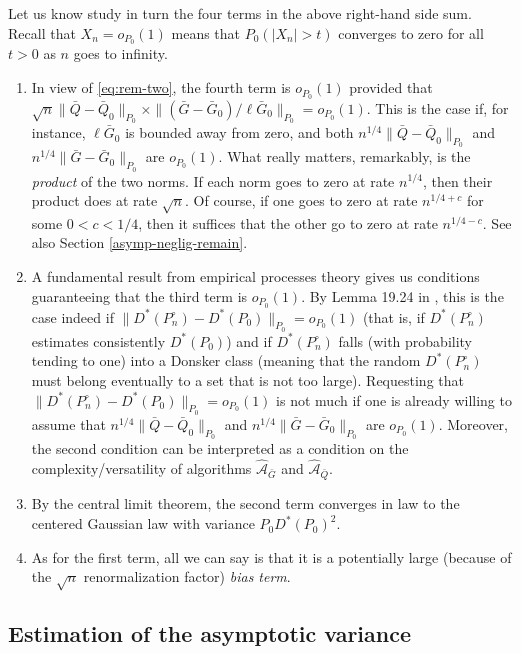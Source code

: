 \documentclass[
  11pt,
  openright,twoside]{book}
\newcommand{\Algo}{\widehat{\mathcal{A}}}
\newcommand{\Gbar}{\bar{G}}
\newcommand{\Phat}{P^{\circ}}
\newcommand{\Qbar}{\bar{Q}}
\theoremstyle{definition}
\theoremstyle{definition}
\theoremstyle{definition}
\theoremstyle{definition}
\theoremstyle{remark}
\begin{document}
Let us know study in turn the four terms in the above right-hand side
sum. Recall that \(X_n = o_{P_0}(1)\) means that \(P_0(|X_n| > t)\) converges to
zero for all \(t>0\) as \(n\) goes to infinity.

\begin{enumerate}
\def\labelenumi{\arabic{enumi}.}
\item
  In view of \eqref{eq:rem-two}, the fourth term is \(o_{P_0}(1)\) provided that
  \(\sqrt{n}\|\Qbar - \Qbar_{0}\|_{P_0} \times \|(\Gbar - \Gbar_{0})/\ell\Gbar_{0}\|_{P_0} = o_{P_0}(1)\). This is the case if, for
  instance, \(\ell\Gbar_{0}\) is bounded away from zero, and both
  \(n^{1/4}\|\Qbar - \Qbar_{0}\|_{P_0}\) and \(n^{1/4}\|\Gbar - \Gbar_{0}\|_{P_0}\) are \(o_{P_0}(1)\). What really matters, remarkably, is
  the \emph{product} of the two norms. If each norm goes to zero at rate
  \(n^{1/4}\), then their product does at rate \(\sqrt{n}\). Of course, if one
  goes to zero at rate \(n^{1/4 + c}\) for some \(0<c<1/4\), then it suffices
  that the other go to zero at rate \(n^{1/4 - c}\). See also Section
  \ref{asymp-neglig-remain}.
\item
  A fundamental result from empirical processes theory gives us conditions
  guaranteeing that the third term is \(o_{P_0}(1)\). By Lemma 19.24 in
  \citep{vdV98}, this is the case indeed if \(\|D^*(\Phat_n) - D^*(P_0)\|_{P_{0}} = o_{P_0} (1)\) (that is, if \(D^*(\Phat_n)\) estimates consistently \(D^*(P_0)\)) and if
  \(D^*(\Phat_n)\) falls (with probability tending to one) into a Donsker class
  (meaning that the random \(D^*(\Phat_n)\) must belong eventually to a set
  that is not too large). Requesting that \(\|D^*(\Phat_n) - D^*(P_0)\|_{P_{0}} = o_{P_0} (1)\) is not much if one is already willing to assume that
  \(n^{1/4}\|\Qbar - \Qbar_{0}\|_{P_0}\) and \(n^{1/4}\|\Gbar - \Gbar_{0}\|_{P_0}\) are \(o_{P_0}(1)\). Moreover, the second condition can be
  interpreted as a condition on the complexity/versatility of algorithms
  \(\Algo_{\Gbar}\) and \(\Algo_{\Qbar}\).
\item
  By the central limit theorem, the second term converges in law to the
  centered Gaussian law with variance \(P_0 D^*(P_0)^2\).
\item
  As for the first term, all we can say is that it is a potentially large
  (because of the \(\sqrt{n}\) renormalization factor) \emph{bias term}.
\end{enumerate}

\hypertarget{estimation-of-the-asymptotic-variance}{%
\subsection{Estimation of the asymptotic variance}\label{estimation-of-the-asymptotic-variance}}
\end{document}
